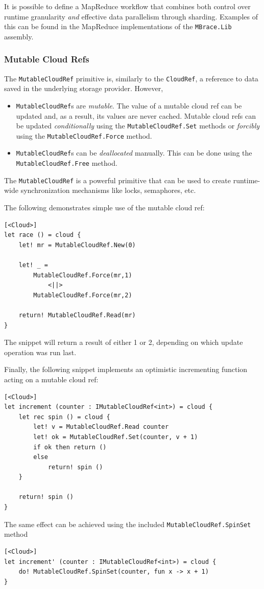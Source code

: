 \documentclass[9pt,a4paper]{article}
\begin{document}
It is possible to define a MapReduce workflow that combines both control
over runtime granularity \emph{and} effective data parallelism through sharding.
Examples of this can be found in the MapReduce implementations of the \texttt{MBrace.Lib}
assembly.

\subsubsection*{Mutable Cloud Refs}
\label{mutableCloudRef}

The \texttt{MutableCloudRef} primitive is, similarly to the \texttt{CloudRef},
a reference to data saved in the underlying storage provider. However,
\begin{itemize}
\item \texttt{MutableCloudRef}s are \emph{mutable}. The value of a mutable cloud ref
can be updated and, as a result, its values are never cached. Mutable cloud refs can
be updated \emph{conditionally} using the \texttt{MutableCloudRef.Set} methods or 
\emph{forcibly} using the \texttt{MutableCloudRef.Force} method.
\item \texttt{MutableCloudRef}s can be \emph{deallocated} manually. This can be done
using the \texttt{MutableCloudRef.Free} method.
\end{itemize}
The \texttt{MutableCloudRef} is a powerful primitive that can be used to create 
runtime-wide synchronization mechanisms like locks, semaphores, etc.

The following demonstrates simple use of the mutable cloud ref:
\begin{lstlisting}
[<Cloud>]
let race () = cloud {
    let! mr = MutableCloudRef.New(0)
 
    let! _ = 
        MutableCloudRef.Force(mr,1)
            <||> 
        MutableCloudRef.Force(mr,2)
 
    return! MutableCloudRef.Read(mr)
}
\end{lstlisting}
The snippet will return a result of either 1 or 2, depending on which update operation
was run last.

Finally, the following snippet implements an optimistic incrementing function
acting on a mutable cloud ref:
\begin{lstlisting}
[<Cloud>]
let increment (counter : IMutableCloudRef<int>) = cloud {
    let rec spin () = cloud {
        let! v = MutableCloudRef.Read counter
        let! ok = MutableCloudRef.Set(counter, v + 1)
        if ok then return ()
        else
            return! spin ()
    }

    return! spin ()
}
\end{lstlisting}
The same effect can be achieved using the included 
\texttt{MutableCloudRef.SpinSet} method
\begin{lstlisting}
[<Cloud>]
let increment' (counter : IMutableCloudRef<int>) = cloud {
    do! MutableCloudRef.SpinSet(counter, fun x -> x + 1)
}
\end{lstlisting}
\end{document}
